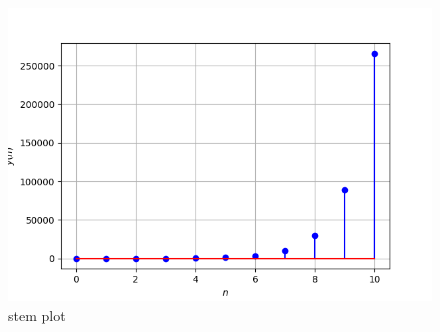 \documentclass[journal,12pt,twocolumn]{IEEEtran}
\theoremstyle{remark}
\begin{document}
\begin{figure}[b]
    \centering
    \includegraphics[width=\columnwidth]{ncert-maths/11/9/3/11/figs/fig1.png}
    \caption{stem plot }
    \label{fig:eshaplot1}
\end{figure}
\end{document}
